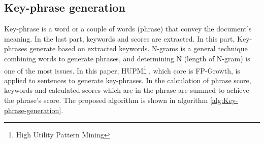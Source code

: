 \documentclass[3p]{elsarticle}
\begin{document}
\subsection{Key-phrase generation}
Key-phrase is a word or a couple of words (phrase) that convey the document's meaning. In the last part, keywords and scores are extracted. In this part, Key-phrases generate based on extracted keywords. N-grams is a general technique combining words to generate phrases, and determining N (length of N-gram) is one of the most issues. In this paper, HUPM\footnote{High Utility Pattern Mining} \cite{huang2015topic}, which core is FP-Growth, is applied to sentences to generate key-phrases. In the calculation of phrase score, keywords and calculated scores which are in the phrase are summed to achieve the phrase's score. The proposed algorithm is shown in algorithm \ref{alg:Key-phrase-generation}.
\end{document}
